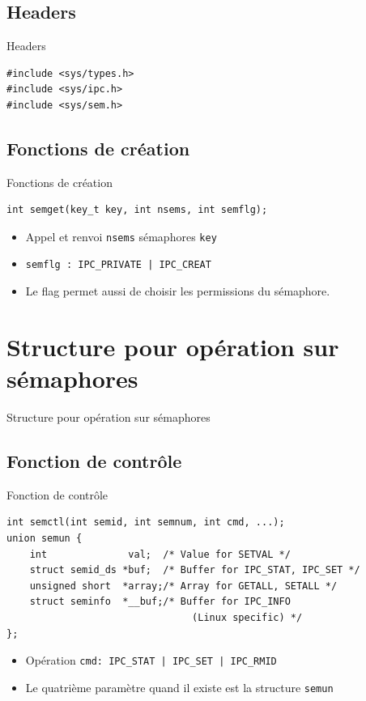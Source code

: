 \section{\sectitle}
\begin{frame}[containsverbatim]{\sectitle}
\def\subsectitle{Headers}
\subsection{\subsectitle}
\begin{block}{\subsectitle}
\begin{verbatim}
#include <sys/types.h>
#include <sys/ipc.h>
#include <sys/sem.h>
\end{verbatim}
\end{block}
\def\subsectitle{Fonctions de création}
\subsection{\subsectitle}
\begin{block}{\subsectitle}
\begin{verbatim}
int semget(key_t key, int nsems, int semflg);
\end{verbatim}
\begin{itemize}
    \item Appel et renvoi \texttt{nsems} sémaphores \texttt{key}
    \item \texttt{semflg : IPC\_PRIVATE | IPC\_CREAT}
    \item Le flag permet aussi de choisir les permissions du sémaphore.
\end{itemize}
\end{block}

\end{frame}

\def\sectitle{Structure pour opération sur sémaphores}
\section{\sectitle}
\begin{frame}[containsverbatim]{\sectitle}
\def\subsectitle{Fonction de contrôle}
\subsection{\subsectitle}
\begin{block}{\subsectitle}
\begin{verbatim}
int semctl(int semid, int semnum, int cmd, ...);
union semun {
    int              val;  /* Value for SETVAL */
    struct semid_ds *buf;  /* Buffer for IPC_STAT, IPC_SET */
    unsigned short  *array;/* Array for GETALL, SETALL */
    struct seminfo  *__buf;/* Buffer for IPC_INFO
                                (Linux specific) */
};
\end{verbatim}
\begin{itemize}
    \item Opération \texttt{cmd: IPC\_STAT | IPC\_SET | IPC\_RMID}
    \item Le quatrième paramètre quand il existe est la structure \texttt{semun}
\end{itemize}
\end{block}
\end{frame}

